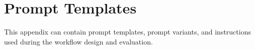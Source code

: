 \chapter{Prompt Templates}
\label{app:prompts}

This appendix can contain prompt templates, prompt variants, and instructions used during the workflow design and evaluation.
